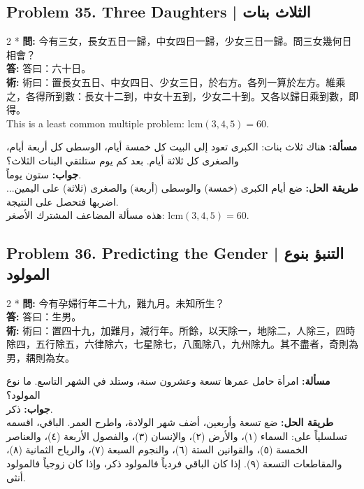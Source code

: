 \documentclass[11pt,a4paper]{article}
\newcommand{\ar}[1]{\arabicfont\beginR #1\endR}
\newcommand{\zh}[1]{{\CJKfamily{}#1}}
\begin{document}
\newpage

\subsection*{Problem 35. Three Daughters | \ar{الثلاث بنات}}

\begin{paracol}{2}
\switchcolumn[0]*\noindent
\textbf{\zh{問}:} \zh{今有三女，長女五日一歸，中女四日一歸，少女三日一歸。問三女幾何日相會？}\\
\textbf{\zh{答}:} \zh{答曰：六十日。}\\
\textbf{\zh{術}:} \zh{術曰：置長女五日、中女四日、少女三日，於右方。各列一算於左方。維乘之，各得所到數：長女十二到，中女十五到，少女二十到。又各以歸日乘到數，即得。}\\[3pt]
This is a least common multiple problem: $\text{lcm}(3,4,5) = 60$.

\switchcolumn
\noindent
\textbf{\ar{مسألة:}} \ar{هناك ثلاث بنات: الكبرى تعود إلى البيت كل خمسة أيام، الوسطى كل أربعة أيام، والصغرى كل ثلاثة أيام. بعد كم يوم ستلتقي البنات الثلاث؟}\\
\textbf{\ar{جواب:}} \ar{ستون يوماً.}\\
\textbf{\ar{طريقة الحل:}} \ar{ضع أيام الكبرى (خمسة) والوسطى (أربعة) والصغرى (ثلاثة) على اليمين... اضربها فتحصل على النتيجة.}\\[3pt]
\ar{هذه مسألة المضاعف المشترك الأصغر: $\text{lcm}(3,4,5) = 60$.}
\end{paracol}

\subsection*{Problem 36. Predicting the Gender | \ar{التنبؤ بنوع المولود}}

\begin{paracol}{2}
\switchcolumn[0]*\noindent
\textbf{\zh{問}:} \zh{今有孕婦行年二十九，難九月。未知所生？}\\
\textbf{\zh{答}:} \zh{答曰：生男。}\\
\textbf{\zh{術}:} \zh{術曰：置四十九，加難月，減行年。所餘，以天除一，地除二，人除三，四時除四，五行除五，六律除六，七星除七，八風除八，九州除九。其不盡者，奇則為男，耦則為女。}

\switchcolumn
\noindent
\textbf{\ar{مسألة:}} \ar{امرأة حامل عمرها تسعة وعشرون سنة، وستلد في الشهر التاسع. ما نوع المولود؟}\\
\textbf{\ar{جواب:}} \ar{ذكر.}\\
\textbf{\ar{طريقة الحل:}} \ar{ضع تسعة وأربعين، أضف شهر الولادة، واطرح العمر. الباقي، اقسمه تسلسلياً على: السماء (١)، والأرض (٢)، والإنسان (٣)، والفصول الأربعة (٤)، والعناصر الخمسة (٥)، والقوانين الستة (٦)، والنجوم السبعة (٧)، والرياح الثمانية (٨)، والمقاطعات التسعة (٩). إذا كان الباقي فردياً فالمولود ذكر، وإذا كان زوجياً فالمولود أنثى.}
\end{paracol}
\end{document}
